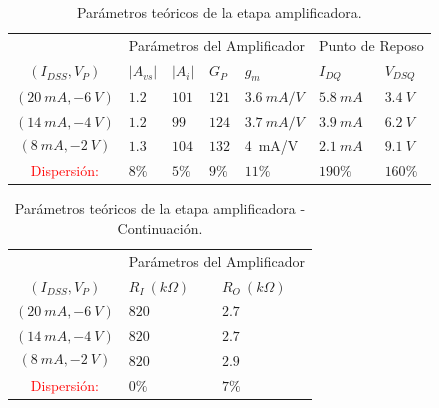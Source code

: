 \documentclass[a4paper, 10pt, spanish]{article}
\begin{document}
\begin{table}[h]
\centering
\begin{tabularx}{1\textwidth}{XXXXXXXX}
\hline
\multicolumn{2}{c}{}				& \multicolumn{4}{c}{Parámetros del Amplificador}						& \multicolumn{2}{c}{Punto de Reposo} \\
									\cmidrule(r){3-6}														\cmidrule(r){7-8}
\multicolumn{2}{c}{$(I_{DSS},V_{P})$}& $|A_{vs}|$  		& $|A_{i}|$ 		& $G_P$ 			& $g_m$ 		& $I_{DQ}$ 			& $V_{DSQ}$			\\
\cmidrule(r){1-2}  									\cmidrule(r){3-3} \cmidrule(r){4-4} 	\cmidrule(r){5-5} 	\cmidrule(r){6-6} \cmidrule(r){7-7} 	\cmidrule(r){8-8}
\multicolumn{2}{c}{$(20\ mA,-6\ V)$}& $1.2$	& $101$	& $121$ & $3.6\ mA/V$ & $5.8\ mA$& $3.4\ V$\\
\hline
\multicolumn{2}{c}{$(14\ mA,-4\ V)$}& $1.2$	& $99$	& $124$ & $3.7\ mA/V$& $3.9\ mA$ & $6.2\ V$\\
\hline
\multicolumn{2}{c}{$$(8\ mA,-2\ V)$$}&$1.3$	& $104$	& $132$ & 4\ mA/V & $2.1\ mA$ & $9.1\ V$ \\
\hline
\hline
\multicolumn{2}{c}{\textcolor{red}{Dispersión:}} & $8\%$ & $5\%$ & $9\%$ & $11\%$ & $190\%$ & $160\% $\\
\hline
\end{tabularx}
\caption{Parámetros teóricos de la etapa amplificadora.}
\label{tab:dispersion}
\end{table}


\begin{table}[h]
\centering
\begin{tabularx}{0.5\textwidth}{XXXX}
\hline
\multicolumn{2}{c}{}				& \multicolumn{2}{c}{Parámetros del Amplificador}					 \\
									\cmidrule(r){3-4}
\multicolumn{2}{c}{$(I_{DSS},V_{P})$}& $R_I\ (k\Omega)$  		& $R_O\ (k\Omega)$ 				\\
\cmidrule(r){1-2}  									\cmidrule(r){3-3} \cmidrule(r){4-4}
\multicolumn{2}{c}{$(20\ mA,-6\ V)$}& $820$	& $2.7$	\\
\hline
\multicolumn{2}{c}{$(14\ mA,-4\ V)$}& $820$	& $2.7$	\\
\hline
\multicolumn{2}{c}{$$(8\ mA,-2\ V)$$}&$820$	& $2.9$	\\
\hline
\hline
\multicolumn{2}{c}{\textcolor{red}{Dispersión:}} & $0\%$ & $7\%$ \\
\hline
\end{tabularx}
\caption{Parámetros teóricos de la etapa amplificadora - Continuación.}
\label{tab:dispersion2}
\end{table}
\end{document}
